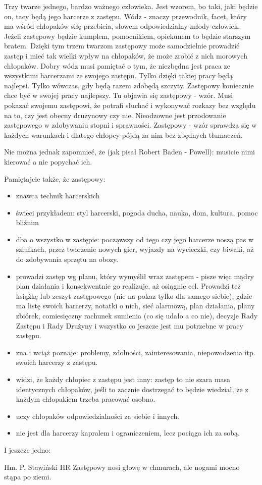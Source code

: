 Trzy twarze jednego, bardzo ważnego człowieka. Jest wzorem, bo taki, jaki będzie on, tacy będą jego harcerze z zastępu. Wódz - znaczy przewodnik, facet, który ma wśród chłopaków siłę przebicia, słowem odpowiedzialny młody człowiek. Jeżeli zastępowy będzie kumplem, pomocnikiem, opiekunem to będzie starszym bratem. Dzięki tym trzem twarzom zastępowy może samodzielnie prowadzić zastęp i mieć tak wielki wpływ na chłopaków, że może zrobić z nich morowych chłopaków.
	Dobry  wódz musi pamiętać o tym, że niezbędna jest praca ze wszystkimi  harcerzami  ze  swojego  zastępu. Tylko dzięki takiej pracy będą najlepsi.  Tylko wówczas, gdy będą razem zdobędą szczyty.
	Zastępowy koniecznie chce być w swojej pracy najlepszy. Tu objawia się zastępowy - wzór. Musi pokazać swojemu zastępowi, że potrafi  słuchać i wykonywać rozkazy bez względu na to, czy jest obecny  drużynowy czy nie. Nieodzowne jest przodowanie zastępowego w zdobywaniu stopni i sprawności. Zastępowy - wzór sprawdza się w każdych warunkach i dlatego chłopcy pójdą za nim bez zbędnych tłumaczeń.

Nie można jednak zapomnieć, że (jak pisał Robert Baden - Powell): musicie nimi kierować a nie popychać ich. 

\noindent
Pamiętajcie także, że zastępowy:
\begin{itemize}\itemsep1pt

\item znawca technik harcerskich
\item  świeci przykładem: styl harcerski, pogoda ducha, nauka, dom, kultura, pomoc bliźnim
\item  dba o wszystko w  zastępie:  począwszy od  tego czy jego harcerze noszą pas  w szlufkach, przez tworzenie nowych gier, wyjazdy na wycieczki, czy biwaki, aż do zdobywania sprzętu na obozy.
\item  prowadzi zastęp wg planu, który wymyślił wraz zastępem - pisze więc mądry plan działania i konsekwentnie go realizuje, aż osiągnie cel. Prowadzi też książkę lub zeszyt zastępowego (nie na  pokaz  tylko dla samego  siebie), gdzie ma listę swoich harcerzy, notatki o nich, sieć alarmową, plan działania, plany zbiórek, comiesięczny rachunek sumienia (co się udało a co nie), decyzje Rady Zastępu i Rady Drużyny i wszystko co jeszcze jest mu potrzebne w pracy zastępu.
\item  zna i wciąż poznaje: problemy, zdolności, zainteresowania, niepowodzenia itp. swoich harcerzy z zastępu.
\item   widzi, że każdy chłopiec z zastępu jest inny: zastęp to nie szara masa identycznych chłopaków, jeśli to zacznie dostrzegać to będzie wiedział,  że  z każdym chłopakiem trzeba pracować osobno.
\item  uczy chłopaków odpowiedzialności za siebie i  innych.
\item  nie jest dla harcerzy kapralem i ograniczeniem, lecz pociąga ich za sobą.
\end{itemize}

I jeszcze jedno:
\begin{aquote}{Hm. P. Stawiński HR}
Zastępowy  nosi  głowę  w chmurach, ale  nogami  mocno  stąpa  po  ziemi.
 \end{aquote}



